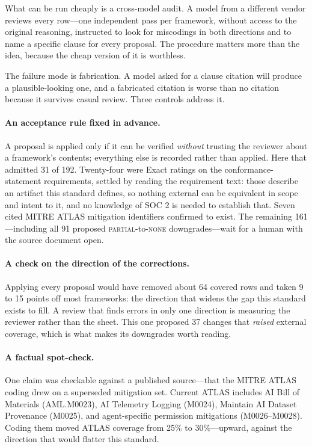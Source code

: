 \documentclass[11pt]{article}
\begin{document}
What can be run cheaply is a cross-model audit. A model from a different vendor
reviews every row---one independent pass per framework, without access to the
original reasoning, instructed to look for miscodings in both directions and to
name a specific clause for every proposal. The procedure matters more than the
idea, because the cheap version of it is worthless.

The failure mode is fabrication. A model asked for a clause citation will
produce a plausible-looking one, and a fabricated citation is worse than no
citation because it survives casual review. Three controls address it.

\paragraph{An acceptance rule fixed in advance.} A proposal is applied only if
it can be verified \emph{without} trusting the reviewer about a framework's
contents; everything else is recorded rather than applied. Here that admitted
31 of 192. Twenty-four were Exact ratings on the conformance-statement
requirements, settled by reading the requirement text: those describe an
artifact this standard defines, so nothing external can be equivalent in scope
and intent to it, and no knowledge of SOC 2 is needed to establish that. Seven
cited MITRE ATLAS mitigation identifiers confirmed to exist. The remaining
161---including all 91 proposed \textsc{partial}-to-\textsc{none}
downgrades---wait for a human with the source document open.

\paragraph{A check on the direction of the corrections.} Applying every
proposal would have removed about 64 covered rows and taken 9 to 15 points off
most frameworks: the direction that widens the gap this standard exists to
fill. A review that finds errors in only one direction is measuring the
reviewer rather than the sheet. This one proposed 37 changes that \emph{raised}
external coverage, which is what makes its downgrades worth reading.

\paragraph{A factual spot-check.} One claim was checkable against a published
source---that the MITRE ATLAS coding drew on a superseded mitigation set.
Current ATLAS includes AI Bill of Materials (AML.M0023), AI Telemetry Logging
(M0024), Maintain AI Dataset Provenance (M0025), and agent-specific permission
mitigations (M0026--M0028). Coding them moved ATLAS coverage from 25\% to
30\%---upward, against the direction that would flatter this standard.
\end{document}
